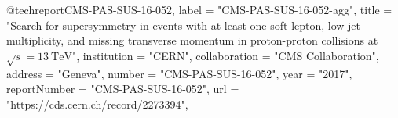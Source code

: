 @techreport{CMS-PAS-SUS-16-052,
      label          = "CMS-PAS-SUS-16-052-agg",
      title         = "{Search for supersymmetry in events with at least one soft
                       lepton, low jet multiplicity, and missing transverse
                       momentum in proton-proton collisions at
                       $\sqrt{s}=13~\mathrm{TeV}$}",
      institution   = "CERN",
      collaboration = "CMS Collaboration",
      address       = "Geneva",
      number        = "CMS-PAS-SUS-16-052",
      year          = "2017",
      reportNumber  = "CMS-PAS-SUS-16-052",
      url           = "https://cds.cern.ch/record/2273394",
}

